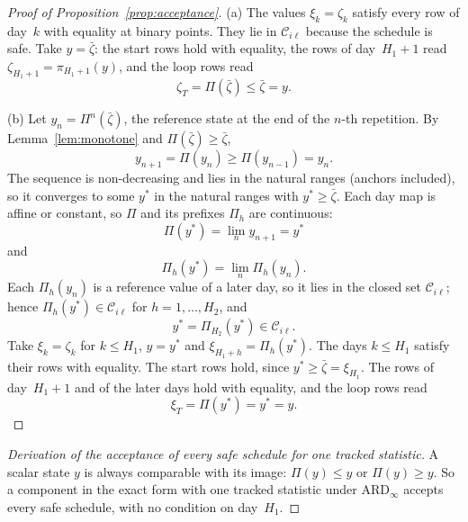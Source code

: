 \documentclass[11pt,a4paper]{article}
\theoremstyle{plain}
\theoremstyle{definition}
\theoremstyle{remark}
\begin{document}
\label{prf:prop:acceptance}
\begin{proof}[Proof of Proposition~\ref{prop:acceptance}]
(a) The values $\xi_k = \zeta_k$ satisfy every row of day~$k$ with equality at binary points.
They lie in $\mathcal{C}_{i\ell}$ because the schedule is safe.
Take $y = \bar\zeta$: the start rows hold with equality, the rows of day~$H_1 + 1$ read $\zeta_{H_1+1} = \pi_{H_1+1}(y)$, and the loop rows read
\begin{equation}
  \zeta_T = \Pi(\bar\zeta) \le \bar\zeta = y.
\end{equation}

(b) Let $y_n = \Pi^n(\bar\zeta)$, the reference state at the end of the $n$-th repetition.
By Lemma~\ref{lem:monotone} and $\Pi(\bar\zeta) \ge \bar\zeta$,
\begin{equation}
  y_{n+1} = \Pi(y_n) \ge \Pi(y_{n-1}) = y_n.
\end{equation}
The sequence is non-decreasing and lies in the natural ranges (anchors included), so it converges to some $y^*$ in the natural ranges with $y^* \ge \bar\zeta$.
Each day map is affine or constant, so $\Pi$ and its prefixes $\Pi_h$ are continuous:
\begin{equation}
  \Pi(y^*) = \lim_n y_{n+1} = y^*
\end{equation}
and
\begin{equation}
  \Pi_h(y^*) = \lim_n \Pi_h(y_n).
\end{equation}
Each $\Pi_h(y_n)$ is a reference value of a later day, so it lies in the closed set $\mathcal{C}_{i\ell}$; hence $\Pi_h(y^*) \in \mathcal{C}_{i\ell}$ for $h = 1, \ldots, H_2$, and
\begin{equation}
  y^* = \Pi_{H_2}(y^*) \in \mathcal{C}_{i\ell}.
\end{equation}
Take $\xi_k = \zeta_k$ for $k \le H_1$, $y = y^*$ and $\xi_{H_1+h} = \Pi_h(y^*)$.
The days $k \le H_1$ satisfy their rows with equality.
The start rows hold, since $y^* \ge \bar\zeta = \xi_{H_1}$.
The rows of day~$H_1 + 1$ and of the later days hold with equality, and the loop rows read
\begin{equation}
  \xi_T = \Pi(y^*) = y^* = y.
\end{equation}
\end{proof}

\label{drv:scalar_acceptance}
\begin{proof}[Derivation of the acceptance of every safe schedule for one tracked statistic]
A scalar state $y$ is always comparable with its image: $\Pi(y) \le y$ or $\Pi(y) \ge y$.
So a component in the exact form with one tracked statistic under $\text{ARD}_\infty$ accepts every safe schedule, with no condition on day~$H_1$.
\end{proof}
\end{document}
